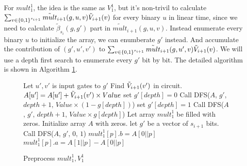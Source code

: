 {	For ${mult}_1^1$, the idea is the same as ${V}_1^1$, but it's non-trivil to calculate $\sum_{v\in \{0,1\}^{s_{i+1}}}\tilde{mult}_{i+1}(g, u, v)\tilde{V}_{i+1}(v)$ for every binary $u$ in linear time, since we need to calculate $\tilde{\beta}_{s_{i}}(g, g')$ part in $\tilde{mult}_{i+1}(g, u, v)$. Instead enumerate every binary $u$ to initialize the array, we can enumberate $g'$ instead. And accumulate the contribution of $(g', u', v')$ to $\sum_{v\in \{0,1\}^{s_{i+1}}}\tilde{mult}_{i+1}(g, u', v)\tilde{V}_{i+1}(v)$. We will use a depth first search to enumerate every $g'$ bit by bit. The detailed algorithm is shown in Algorithm \ref{alg::premult}.
	\begin{figure}[p]
		\begin{algorithm}[H]
			\label{alg::premult}
			\caption{Preprocess ${mult}_1^1, {V}_1^1$}
			\begin{algorithmic}[1]
				 
				\State Let $u', v'$ is input gates to $g'$
				\State Find $\tilde{V}_{i+1}(v')$ in circuit.
				\State $A[u'] = A[u'] + \tilde{V}_{i+1}(v')\times Value$
				\Else
				\State set $g'[depth]=0$
				\State Call {\sf DFS}($A$, $g'$, $depth+1$, $Value\times(1-g[depth])$)
				\State set $g'[depth]=1$
				\State Call {\sf DFS}($A$, $g'$, $depth+1$, $Value\times g[depth]$)
				\EndIf
				\EndProcedure
				\State Let array ${mult}_1^1$ be filled with zeros.
				\State Initialize array $A$ with zeros.
				\State let $g'$ be a vector of $s_{i+1}$ bits.
				\State Call {\sf DFS}($A$, $g'$, $0$, $1$)
				\State ${mult}_1^1[p].b=A[0||p]$
				\State ${mult}_1^1[p].a=A[1||p]-A[0||p]$
				\EndFor
				\EndProcedure
			\end{algorithmic}
		\end{algorithm}
	\end{figure}
	
}
